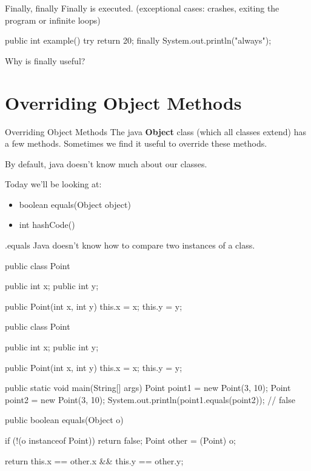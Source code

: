 \documentclass[week4]{csse2002}
\begin{document}
\begin{topic}{Finally, finally}
Finally is  executed. (exceptional cases: crashes, exiting the program or infinite loops)

\begin{java}
public int example() {
	try {
	    return 20;
    } finally {
        System.out.println("always");
    }
}
\end{java}

Why is finally useful?
\end{topic}

\section{Overriding Object Methods}
\begin{topic}{Overriding Object Methods}
The java \textbf{Object} class (which all classes extend) has a few
methods. Sometimes we find it useful to override these methods.

By default, java doesn't know much about our classes.

Today we'll be looking at:
\begin{itemize}
	\item boolean equals(Object object)
	\item int hashCode()
\end{itemize}
\end{topic}

\begin{topic}{.equals}
Java doesn't know how to compare two instances of a class.

\begin{subtopic}{1}
\begin{java}
public class Point {
	public int x;
	public int y;

	public Point(int x, int y) {
		this.x = x;
		this.y = y;
	}
}
\end{java}
\end{subtopic}

\begin{subtopic}{2}
\begin{java}
public class Point {
	public int x;
	public int y;

	public Point(int x, int y) {
		this.x = x;
		this.y = y;
	}

	public static void main(String[] args) {
		Point point1 = new Point(3, 10);
		Point point2 = new Point(3, 10);
		System.out.println(point1.equals(point2)); // false
	}
}
\end{java}
\end{subtopic}

\begin{subtopic}{3}
\begin{java}
public boolean equals(Object o) {
	if (!(o instanceof Point)) {
		return false;
	}
	Point other = (Point) o;

	return this.x == other.x && this.y == other.y;
}
\end{java}
\end{subtopic}
\end{topic}
\end{document}
